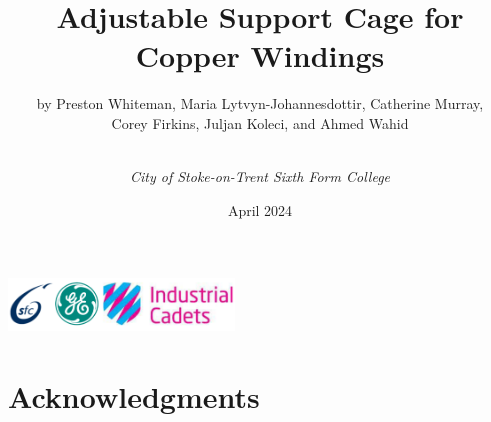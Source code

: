 \documentclass[a4paper,10pt]{article}
\title{\textbf{Adjustable Support Cage for Copper Windings}}
\author{by Preston Whiteman, Maria Lytvyn-Johannesdottir, Catherine Murray, \\ Corey Firkins, Juljan Koleci, and Ahmed Wahid\and \\ \textit{City of Stoke-on-Trent Sixth Form College}}
\date{April 2024}
\begin{document}

\maketitle
\begin{center}
    \includegraphics[width = 6cm, height = 1.5cm]{logos.png}
\end{center}
\pagebreak



\tableofcontents
\pagebreak



\section{Acknowledgments}
\end{document}
